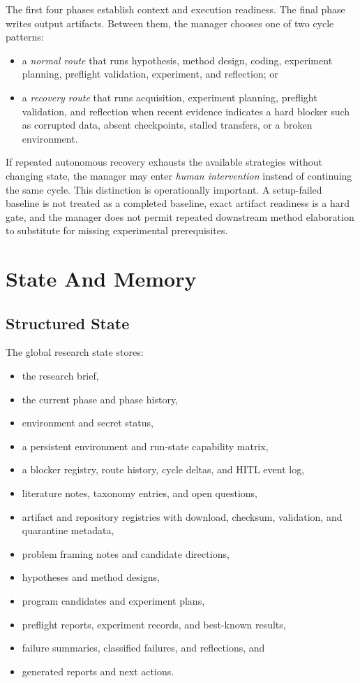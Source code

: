 \documentclass[11pt]{article}
\begin{document}
The first four phases establish context and execution readiness. The final phase writes output artifacts. Between them, the manager chooses one of two cycle patterns:
\begin{itemize}[leftmargin=1.5em]
  \item a \emph{normal route} that runs hypothesis, method design, coding, experiment planning, preflight validation, experiment, and reflection; or
  \item a \emph{recovery route} that runs acquisition, experiment planning, preflight validation, and reflection when recent evidence indicates a hard blocker such as corrupted data, absent checkpoints, stalled transfers, or a broken environment.
\end{itemize}

If repeated autonomous recovery exhausts the available strategies without changing state, the manager may enter \emph{human intervention} instead of continuing the same cycle. This distinction is operationally important. A setup-failed baseline is not treated as a completed baseline, exact artifact readiness is a hard gate, and the manager does not permit repeated downstream method elaboration to substitute for missing experimental prerequisites.

\section{State And Memory}
\subsection{Structured State}
The global research state stores:
\begin{itemize}[leftmargin=1.5em]
  \item the research brief,
  \item the current phase and phase history,
  \item environment and secret status,
  \item a persistent environment and run-state capability matrix,
  \item a blocker registry, route history, cycle deltas, and HITL event log,
  \item literature notes, taxonomy entries, and open questions,
  \item artifact and repository registries with download, checksum, validation, and quarantine metadata,
  \item problem framing notes and candidate directions,
  \item hypotheses and method designs,
  \item program candidates and experiment plans,
  \item preflight reports, experiment records, and best-known results,
  \item failure summaries, classified failures, and reflections, and
  \item generated reports and next actions.
\end{itemize}
\end{document}
